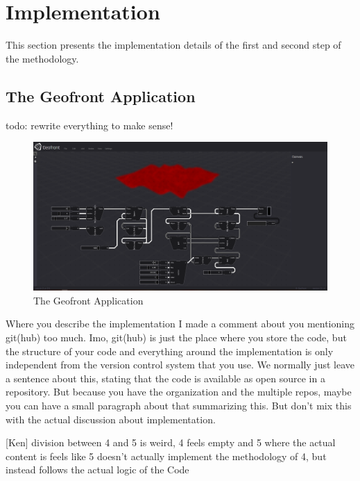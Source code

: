 \chapter{Implementation}%
\label{chap:implementation}
This section presents the implementation details of the first and second step of the methodology. 

\section{The Geofront Application}

\begin{note}
  todo: rewrite everything to make sense! 
\end{note}

\begin{figure}
  \centering
  \graphicspath{ {../../assets/images/implementation/} }
  \includegraphics[width=\linewidth]{full-application.png}
  \caption[Geofront]{The Geofront Application}
  \label{fig:geofront-app}
\end{figure}

\begin{note}
  [Stelios]  Where you describe the implementation I made a comment about you mentioning git(hub) too much. Imo, git(hub) is just the place where you store the code, but the structure of your code and everything around the implementation is only independent from the version control system that you use. We normally just leave a sentence about this, stating that the code is available as open source in a repository. But because you have the organization and the multiple repos, maybe you can have a small paragraph about that summarizing this. But don't mix this with the actual discussion about implementation.

  [Ken] division between 4 and 5 is weird, 4 feels empty and 5 where the actual content is  feels like 5 doesn't actually implement the methodology of 4, but instead follows the actual logic of the Code
  
\end{note}

